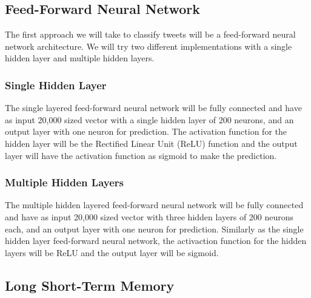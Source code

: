 \subsection{Feed-Forward Neural Network} The first approach we will
take to classify tweets will be a feed-forward neural network
architecture. We will try two different implementations with a single
hidden layer and multiple hidden layers.

\subsubsection{Single Hidden Layer} The single layered feed-forward
neural network will be fully connected and have as input 20,000 sized
vector with a single hidden layer of 200 neurons, and an output
layer with one neuron for prediction. The activation function for the
hidden layer will be the Rectified Linear Unit (ReLU) function and the
output layer will have the activation function as sigmoid to make the
prediction.

\subsubsection{Multiple Hidden Layers} The multiple hidden layered
feed-forward neural network will be fully connected and have as input
20,000 sized vector with three hidden layers of 200 neurons each, and
an output layer with one neuron for prediction. Similarly as the
single hidden layer feed-forward neural network, the activaction
function for the hidden layers will be ReLU and the output layer will
be sigmoid.

\subsection{Long Short-Term Memory}

